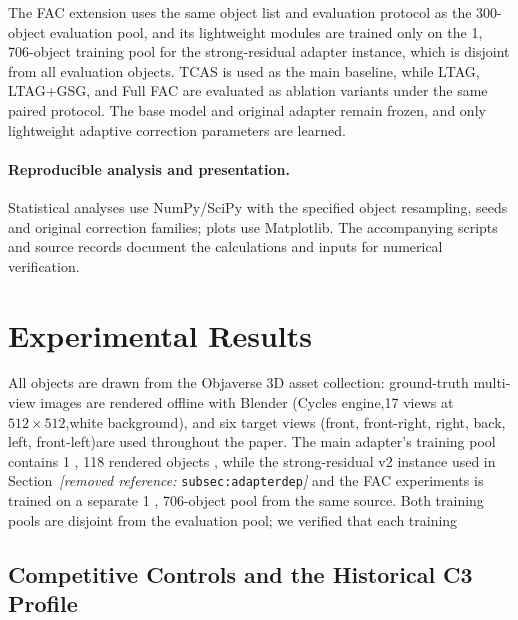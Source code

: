 \documentclass[times,twocolumn,final]{elsarticle}
\providecommand{\DIFadd}[1]{{\protect\color{blue} \sf #1}} %
\providecommand{\DIFdel}[1]{{\protect\color{red} \scriptsize #1}} %
\providecommand{\DIFaddbegin}{} %
\providecommand{\DIFaddend}{} %
\providecommand{\DIFdelbegin}{} %
\providecommand{\DIFdelend}{} %
\begin{document}
\DIFdelbegin \DIFdel{The FAC extension uses the same object list and evaluation protocol as the 300-object evaluation pool, and its lightweight modules are trained only on the 1, 706-object training pool for the strong-residual adapter instance, which is disjoint from all evaluation objects. TCAS is used as the main baseline, while LTAG, LTAG+GSG, and Full FAC are evaluated as ablation variants under the same paired protocol. The base model and original adapter remain frozen, and only lightweight adaptive correction parameters are learned. }\DIFdelend \DIFaddbegin \paragraph{Reproducible analysis and presentation.}
\DIFadd{Statistical analyses use NumPy/SciPy with the specified object resampling, seeds and original correction families; plots use Matplotlib. The accompanying scripts and source records document the calculations and inputs for numerical verification.
}\DIFaddend 

\DIFdelbegin %
\DIFdelend \DIFaddbegin \section{Experimental Results}
\label{sec:experiments}
\DIFaddend 

\DIFdelbegin \DIFdel{All objects are drawn from the Objaverse 3D asset collection: ground-truth multi-view images are rendered offline with Blender (Cycles engine,17 views at $512\times512$,white background), and six target views (front, front-right, right, back, left, front-left)are used throughout the paper. The main adapter's training pool contains 1}%
\DIFdel{,}%
\DIFdel{118 rendered objects , while the strong-residual v2 instance used in Section~\textit{[removed reference: }\texttt{subsec:adapterdep}\textit{]} and the FAC experiments is trained on a separate 1}%
\DIFdel{, }%
\DIFdel{706-object pool from the same source. Both training pools are disjoint from the evaluation pool; we verified that each training}\DIFdelend \DIFaddbegin \subsection{Competitive Controls and the Historical C3 Profile}
\label{subsec:largescale}
\end{document}
